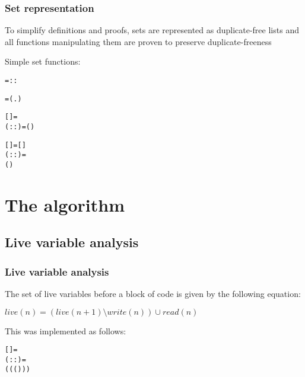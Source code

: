 \documentclass{beamer}
\begin{document}
\begin{frame}[containsverbatim]
\frametitle{Set representation}
To simplify definitions and proofs, sets are represented as duplicate-free lists and all functions manipulating them are proven to preserve duplicate-freeness

Simple set functions:

\begin{alltt}\small
	   =        ::
\end{alltt}

\begin{alltt}\small
	   =  (\HOLTokenLambda{}.  \HOLTokenNotEqual{} ) 
\end{alltt}

\begin{alltt}\small
	  = 
 (::)  =   (  )
\end{alltt}

\begin{alltt}\small
	 = []
 (::) =
  ( )
\end{alltt}
\end{frame}

\section{The algorithm}
\subsection{Live variable analysis}

\begin{frame}[containsverbatim]
\frametitle{Live variable analysis}
The set of live variables before a block of code is given by the following equation:

\begin{center}
$live(n) = \left(live(n+1) \setminus write(n)\right) \cup read(n)$
\end{center}

This was implemented as follows:

\begin{alltt}\small
	  = 
 (   ::)  =
  (  (  (  )))
\end{alltt}
\end{frame}
\end{document}
